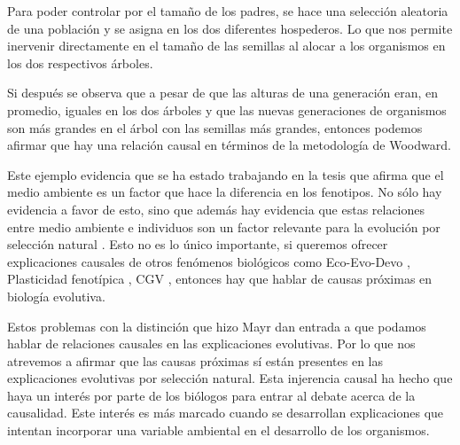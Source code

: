 \begin{center}
\end{center}


Para poder controlar por el tamaño de los padres, se hace una selección aleatoria de una población y se asigna en los dos diferentes hospederos. Lo que nos permite inervenir directamente en el tamaño de las semillas al alocar a los organismos en los dos respectivos árboles.

\begin{center}
\end{center}

Si después se observa que a pesar de que las alturas de una generación eran, en promedio, iguales en los dos árboles y que las nuevas generaciones de organismos son más grandes en el árbol con las semillas más grandes, entonces podemos afirmar que hay una relación causal en términos de la metodología de Woodward.

Este ejemplo evidencia que se ha estado trabajando en la tesis que afirma que el medio ambiente es un factor que hace la diferencia en los fenotipos. No sólo hay evidencia a favor de esto, sino que además hay evidencia que estas relaciones entre medio ambiente e individuos son un factor relevante para la evolución por selección natural \cite{Jablonka2020, Dayan2020, MacColl2011}. Esto no es lo único importante, si queremos ofrecer explicaciones causales de otros fenómenos biológicos como Eco-Evo-Devo \cite{PfenningEco-Evo-Devo}, Plasticidad fenotípica \cite{WESTEBERHARD20082701}, CGV \cite{CVG}, entonces hay que hablar de causas próximas en biología evolutiva.

Estos problemas con la distinción que hizo Mayr dan entrada a que podamos hablar de relaciones causales en las explicaciones evolutivas. Por lo que nos atrevemos a afirmar que las causas próximas sí están presentes en las explicaciones evolutivas por selección natural. Esta injerencia causal ha hecho que haya un interés por parte de los biólogos para entrar al debate acerca de la causalidad. Este interés es más marcado cuando se desarrollan explicaciones que intentan incorporar una variable ambiental en el desarrollo de los organismos.

